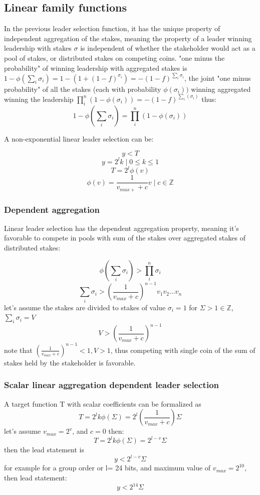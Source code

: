 \documentclass{article}
\begin{document}
\subsection {Linear family functions}

In the previous leader selection function, it has the unique
property of independent aggregation of the stakes, meaning the
property of a leader winning leadership with stakes $\sigma$
is independent of whether the stakeholder would act as a pool
of stakes, or distributed stakes on competing coins.  "one minus
the probability" of winning leadership with aggregated stakes is
$1-\phi(\sum_{i}\sigma_i)=1-(1+(1-f)^{\sigma_i})=-(1-f)^{\sum_{i}\sigma_i}$,
the joint "one minus probability" of all the stakes (each with
probability $\phi(\sigma_i))$ winning aggregated winning the leadership
$\prod_{i}^{n}(1-\phi(\sigma_i))=-(1-f)^{\sum_i(\sigma_i)}$ thus: $$
1-\phi(\sum_{i}\sigma_i) =\prod_{i}^{n}(1-\phi(\sigma_i)) $$

A non-exponential  linear leader selection can be:

$$y < T $$ $$y = 2^lk \mid 0 \le k \le 1$$ $$T = 2^l\phi(v)$$ $$
\phi(v)=\frac{1}{v_{max+}+c}v  \mid c \in \mathbb{Z}$$

\subsubsection{ Dependent aggregation}

Linear leader selection has the dependent aggregation property, meaning
it's favorable to compete in pools with sum of the stakes over aggregated
stakes of distributed stakes:

$$\phi(\sum_{i}{\sigma_i})>\prod_{i}^{n}{\sigma_i}$$
$$\sum_{i}{\sigma_i}>(\frac{1}{v_{max}+c})^{n-1}v_1v_2 \dots
v_n$$ let's assume the stakes are divided to stakes of value
$\sigma_i=1$ for $\Sigma>1 \in \mathbb{Z}$, $\sum_{i}{\sigma_i}=V$
$$V>(\frac{1}{v_{max}+c})^{n-1}$$ note that $(\frac{1}{v_{max}+c})^{n-1}
< 1, V>1$, thus competing with single coin of the sum of stakes held by
the stakeholder is favorable.

\subsubsection{ Scalar linear aggregation dependent leader selection}

A target function T with scalar coefficients can be formalized as
$$T=2^lk\phi(\Sigma)=2^l(\frac{1}{v_{max}+c})\Sigma$$ let's assume
$v_{max}=2^v$, and $c=0$ then: $$T=2^lk\phi(\Sigma)=2^{l-v}\Sigma$$
then the lead statement is $$y<2^{l-v}\Sigma$$ for example for a group
order or l=    24 bits, and maximum value of $v_{max}=2^{10}$, then
lead statement: $$y<2^{14}\Sigma$$
\end{document}
